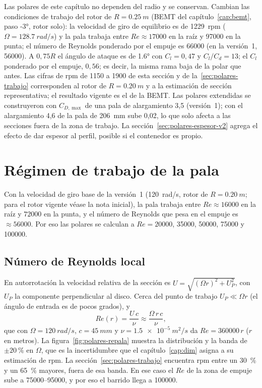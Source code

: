 \begin{nota}
Las polares de este capítulo no dependen del radio y se conservan. Cambian las condiciones de trabajo del rotor de $R=\SI{0.25}{m}$
(BEMT del capítulo~\ref{cap:bemt}, paso \ang{-3}, rotor solo): la velocidad de giro de equilibrio es de \num{1229}~rpm ($\Omega=\SI{128.7}{rad/s}$) y la
pala trabaja entre $Re\approx\num{17000}$ en la raíz y \num{97000} en la punta; el número de Reynolds ponderado por el empuje es
\num{66000} (en la versión~1, \num{56000}). A $0{,}75R$ el ángulo de ataque es de \ang{1.6} con $C_l=0{,}47$ y $C_l/C_d=13$; el
$C_l$ ponderado por el empuje, $0{,}56$; es decir, la misma rama baja de la polar que antes. Las cifras de rpm de 1150 a 1900 de esta
sección y de la~\ref{sec:polares-trabajo} corresponden al rotor de $R=\SI{0.20}{m}$ y a la estimación de sección representativa; el
resultado vigente es el de la BEMT. Las polares extendidas se construyeron con $C_{D,\max}$ de una pala de alargamiento 3,5 (versión~1); con el
alargamiento 4,6 de la pala de \SI{206}{mm} sube 0,02, lo que solo afecta a las secciones fuera de la zona de trabajo.
La sección~\ref{sec:polares-espesor-v2} agrega el efecto de dar espesor al perfil, posible si el contenedor es propio.
\end{nota}

\section{Régimen de trabajo de la pala}\label{sec:polares-regimen}

Con la velocidad de giro base de la versión~1 (\SI{120}{rad/s}, rotor de $R=\SI{0.20}{m}$; para
el rotor vigente véase la nota inicial), la pala trabaja entre
$Re\approx\num{16000}$ en la raíz y $\num{72000}$ en la punta, y el número de Reynolds que
pesa en el empuje es $\approx\num{56000}$. Por eso las polares se
calculan a $Re=\num{20000}$, \num{35000}, \num{50000}, \num{75000} y \num{100000}.

\subsection{Número de Reynolds local}
En autorrotación la velocidad relativa de la sección es
$U=\sqrt{(\Omega r)^2+U_P^2}$, con $U_P$ la componente perpendicular al disco. Cerca del
punto de trabajo $U_P\ll\Omega r$ (el ángulo de entrada es de pocos grados), y
\begin{equation}
  Re(r)=\frac{U\,c}{\nu}\approx\frac{\Omega\,r\,c}{\nu},
  \label{eq:polares-re}
\end{equation}
que con $\Omega=\SI{120}{rad/s}$, $c=\SI{45}{mm}$ y $\nu=\SI{1.5e-5}{m^2/s}$ da
$Re=\num{360000}\,r$ ($r$ en metros). La figura~\ref{fig:polares-repala} muestra la
distribución y la banda de $\pm\SI{20}{\percent}$ en $\Omega$, que es la incertidumbre
que el capítulo~\ref{cap:dim} asigna a su estimación de rpm. La
sección~\ref{sec:polares-trabajo} encuentra rpm entre un \SI{30}{\percent} y un
\SI{65}{\percent} mayores, fuera de esa banda. En ese caso el $Re$ de la zona de empuje
sube a \num{75000}--\num{95000}, y por eso el barrido llega a \num{100000}.

